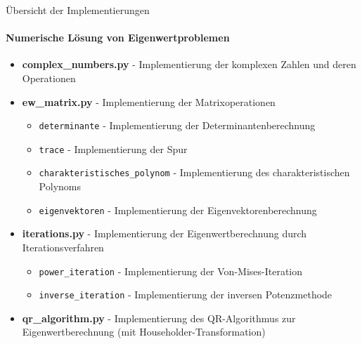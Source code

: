 \begin{KR}{Übersicht der Implementierungen}
\paragraph{Numerische Lösung von Eigenwertproblemen}
\begin{itemize}
    \item \textbf{complex_numbers.py} - Implementierung der komplexen Zahlen und deren Operationen
    \item \textbf{ew_matrix.py} - Implementierung der Matrixoperationen
    \begin{itemize}
        \item \texttt{determinante} - Implementierung der Determinantenberechnung
        \item \texttt{trace} - Implementierung der Spur
        \item \texttt{charakteristisches_polynom} - Implementierung des charakteristischen Polynoms
        \item \texttt{eigenvektoren} - Implementierung der Eigenvektorenberechnung
    \end{itemize}
    \item \textbf{iterations.py} - Implementierung der Eigenwertberechnung durch Iterationsverfahren
    \begin{itemize}
        \item \texttt{power_iteration} - Implementierung der Von-Mises-Iteration
        \item \texttt{inverse_iteration} - Implementierung der inversen Potenzmethode
    \end{itemize}
    \item \textbf{qr_algorithm.py} - Implementierung des QR-Algorithmus zur Eigenwertberechnung (mit Householder-Transformation)
\end{itemize}
\end{KR}


